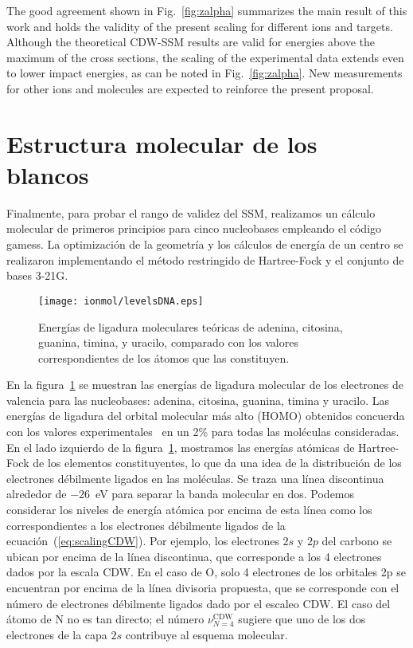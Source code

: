 The good agreement shown in Fig.~\ref{fig:zalpha} summarizes the main 
result of this work and holds the validity of the present scaling for 
different ions and targets. Although the theoretical CDW-SSM results 
are valid for energies above the maximum of the cross sections, the 
scaling of the experimental data extends even to lower impact energies, 
as can be noted in Fig.~\ref{fig:zalpha}. New measurements for other 
ions and molecules are expected to reinforce the present proposal. 

\section{Estructura molecular de los blancos}
\label{sec:molcalculations}

Finalmente, para probar el rango de validez del SSM, realizamos un 
cálculo molecular de primeros principios para cinco nucleobases 
empleando el código {\sc gamess}. La optimización de la geometría y los 
cálculos de energía de un centro se realizaron implementando el método
restringido de Hartree-Fock y el conjunto de bases 3-21G. 

\begin{figure}
\centering
\texttt{[image: ionmol/levelsDNA.eps]}
\caption[Energías de ligadura moleculares teóricas de ADN y ARN.]
{Energías de ligadura moleculares teóricas de adenina, citosina, guanina, 
timina, y uracilo, comparado con los valores correspondientes de los 
átomos que las constituyen.}
\label{fig:bindener}
\end{figure}

En la figura~\ref{fig:bindener} se muestran las energías de ligadura 
molecular de los electrones de valencia para las nucleobases: adenina, 
citosina, guanina, timina y uracilo. Las energías de ligadura del orbital 
molecular más alto (HOMO) obtenidos concuerda con los valores
experimentales~\cite{Hush,Verkin,Dougherty} en un 2\% para todas las 
moléculas consideradas. En el lado izquierdo de la figura~\ref{fig:bindener}, 
mostramos las energías atómicas de Hartree-Fock de los elementos 
constituyentes, lo que da una idea de la distribución de los electrones
débilmente ligados en las moléculas. Se traza una línea discontinua 
alrededor de $-26$~eV para separar la banda molecular en dos. Podemos 
considerar los niveles de energía atómica por encima de esta línea como 
los correspondientes a los electrones débilmente ligados de la 
ecuación~(\ref{eq:scalingCDW}). Por ejemplo, los electrones $2s$ y $2p$ 
del carbono se ubican por encima de la línea discontinua, que corresponde 
a los 4 electrones dados por la escala CDW. En el caso de O, solo 4 
electrones de los orbitales 2p se encuentran por encima de la línea 
divisoria propuesta, que se corresponde con el número de electrones
débilmente ligados dado por el escaleo CDW. El caso del átomo de N no 
es tan directo; el número $\nu_{N=4}^{\text{CDW}}$ sugiere que uno de 
los dos electrones de la capa $2s$ contribuye al esquema molecular.

